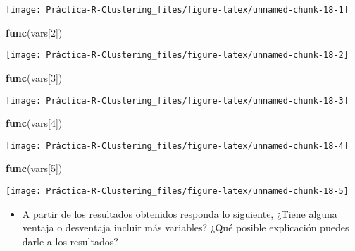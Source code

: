 \documentclass[]{article}
\newenvironment{Shaded}{\begin{snugshade}}{\end{snugshade}}
\newcommand{\DecValTok}[1]{\textcolor[rgb]{0.00,0.00,0.81}{#1}}
\newcommand{\KeywordTok}[1]{\textcolor[rgb]{0.13,0.29,0.53}{\textbf{#1}}}
\newcommand{\NormalTok}[1]{#1}
\providecommand{\tightlist}{%
  \setlength{\itemsep}{0pt}\setlength{\parskip}{0pt}}
\begin{document}
\begin{center}\texttt{[image: Práctica-R-Clustering\_files/figure-latex/unnamed-chunk-18-1]} \end{center}

\begin{Shaded}
\begin{Highlighting}[]
\KeywordTok{func}\NormalTok{(vars[}\DecValTok{2}\NormalTok{])}
\end{Highlighting}
\end{Shaded}

\begin{center}\texttt{[image: Práctica-R-Clustering\_files/figure-latex/unnamed-chunk-18-2]} \end{center}

\begin{Shaded}
\begin{Highlighting}[]
\KeywordTok{func}\NormalTok{(vars[}\DecValTok{3}\NormalTok{])}
\end{Highlighting}
\end{Shaded}

\begin{center}\texttt{[image: Práctica-R-Clustering\_files/figure-latex/unnamed-chunk-18-3]} \end{center}

\begin{Shaded}
\begin{Highlighting}[]
\KeywordTok{func}\NormalTok{(vars[}\DecValTok{4}\NormalTok{])}
\end{Highlighting}
\end{Shaded}

\begin{center}\texttt{[image: Práctica-R-Clustering\_files/figure-latex/unnamed-chunk-18-4]} \end{center}

\begin{Shaded}
\begin{Highlighting}[]
\KeywordTok{func}\NormalTok{(vars[}\DecValTok{5}\NormalTok{])}
\end{Highlighting}
\end{Shaded}

\begin{center}\texttt{[image: Práctica-R-Clustering\_files/figure-latex/unnamed-chunk-18-5]} \end{center}

\begin{itemize}
\tightlist
\item
  A partir de los resultados obtenidos responda lo siguiente, ¿Tiene
  alguna ventaja o desventaja incluir más variables? ¿Qué posible
  explicación puedes darle a los resultados?
\end{itemize}
\end{document}
